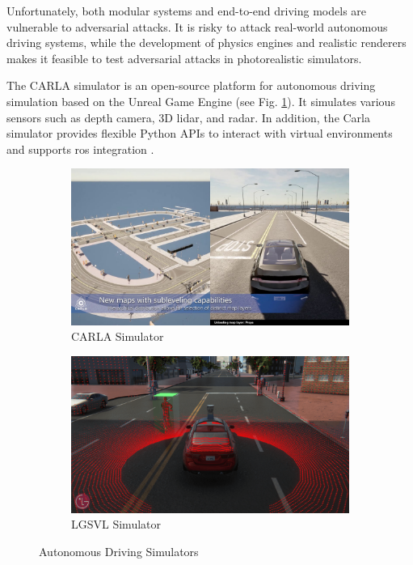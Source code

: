 Unfortunately, both modular systems and end-to-end driving models are vulnerable to adversarial attacks. It is risky to attack real-world autonomous driving systems, while the development of physics engines and realistic renderers makes it feasible to test adversarial attacks in photorealistic simulators.
 

The CARLA simulator is an open-source platform for autonomous driving simulation based on the Unreal Game Engine (see Fig. \ref{fig:carla_intro}). It simulates various sensors such as depth camera, 3D lidar, and radar. In addition, the Carla simulator provides flexible Python APIs to interact with virtual environments and supports \acrfull{ros} integration \citep{Dosovitskiy17}.

\begin{figure}[H]
\centering
\begin{subfigure}[b]{0.49\textwidth}
    \centering
    \includegraphics[width=\textwidth]{figures/chapter_intro/carla.jpg}
    \caption{CARLA Simulator \citep{Dosovitskiy17}}
    \label{fig:carla_intro}
\end{subfigure}
\hfill
\begin{subfigure}[b]{0.49\textwidth}
    \centering
    \includegraphics[width=\textwidth]{figures/chapter_intro/lgsvl.png}
    \caption{LGSVL Simulator\citep{rong2020lgsvl}}
    \label{fig:lvsvl}
\end{subfigure}
\hfill
\caption{Autonomous Driving Simulators}
\label{fig.simulator}
\end{figure}

